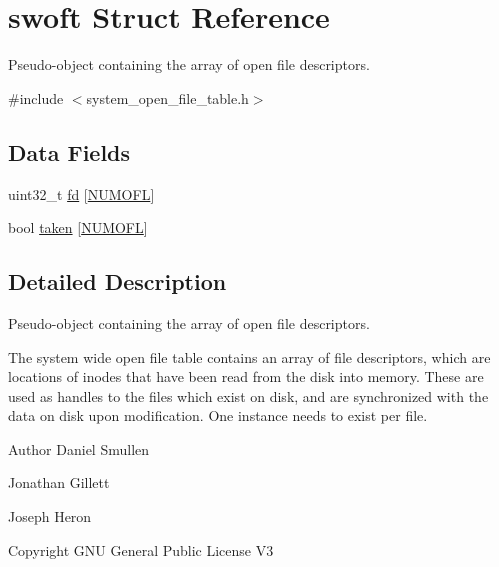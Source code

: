 \hypertarget{structswoft}{\section{swoft Struct Reference}
\label{structswoft}
}


Pseudo-\/object containing the array of open file descriptors.  




{\ttfamily \#include $<$system\-\_\-open\-\_\-file\-\_\-table.\-h$>$}

\subsection*{Data Fields}
\begin{DoxyCompactItemize}
\item 
uint32\-\_\-t \hyperlink{structswoft_a9d67be2cf79bebabe7084963238d6340}{fd} \mbox{[}\hyperlink{glob__data_8h_a8cb920b3b277c4d76122688e1177883d}{N\-U\-M\-O\-F\-L}\mbox{]}
\item 
bool \hyperlink{structswoft_a7d989b9d4ff7182b0fe7b396fd704a46}{taken} \mbox{[}\hyperlink{glob__data_8h_a8cb920b3b277c4d76122688e1177883d}{N\-U\-M\-O\-F\-L}\mbox{]}
\end{DoxyCompactItemize}


\subsection{Detailed Description}
Pseudo-\/object containing the array of open file descriptors. 

The system wide open file table contains an array of file descriptors, which are locations of inodes that have been read from the disk into memory. These are used as handles to the files which exist on disk, and are synchronized with the data on disk upon modification. One instance needs to exist per file.

\begin{DoxyAuthor}{Author}
Daniel Smullen

Jonathan Gillett

Joseph Heron
\end{DoxyAuthor}
\begin{DoxyCopyright}{Copyright}
G\-N\-U General Public License V3 
\end{DoxyCopyright}


